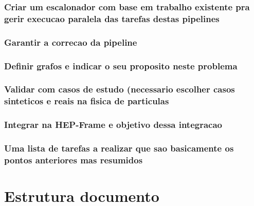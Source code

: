 \subsubsection{Criar um escalonador com base em trabalho existente pra gerir execucao paralela das tarefas destas pipelines}
\subsubsection{Garantir a correcao da pipeline}
\subsubsection{Definir grafos e indicar o seu proposito neste problema}
\subsubsection{Validar com casos de estudo (necessario escolher casos sinteticos e reais na fisica de particulas}
\subsubsection{Integrar na HEP-Frame e objetivo dessa integracao}
\subsubsection{Uma lista de tarefas a realizar que sao basicamente os pontos anteriores mas resumidos}




\section{Estrutura documento}